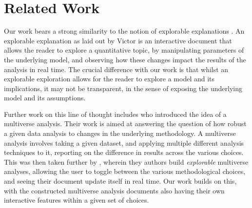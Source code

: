 \section{Related Work}
\label{sec:related}

Our work bears a strong similarity to the notion of explorable explanations \cite{victor11b}.
An explorable explanation as laid out by Victor is an interactive document that allows the reader to
explore a quantitative topic, by manipulating parameters of the underlying model, and observing how these
changes impact the results of the analysis in real time. The crucial difference with our work is that 
whilst an explorable exploration allows for the reader to explore a model and its implications, it may
not be transparent, in the sense of exposing the underlying model and its assumptions.

Further work on this line of thought includes \cite{steegen16} who introduced the idea of a multiverse
analysis. Their work is aimed at answering the question of how robust a given data analysis to changes
in the underlying methodology. A multiverse analysis involves taking a given dataset, and applying 
multiple different analysis techniques to it, reporting on the difference in results across the various choices.
This was then taken further by \cite{dragicevic19}, wherein they authors build \textit{explorable} multiverse
analyses, allowing the user to toggle between the various methodological choices, and seeing their document
update itself in real time. Our work builds on this, with the constructed multiverse analysis documents also
having their own interactive features within a given set of choices.